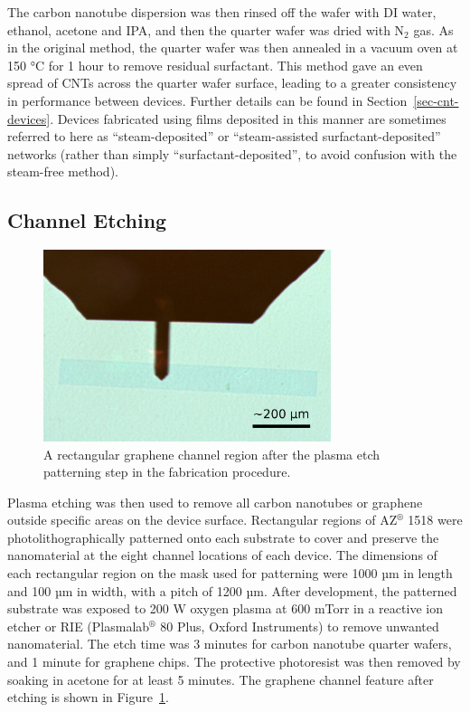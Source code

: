 \documentclass[
  a4paper,
]{scrbook}
\begin{document}
The carbon nanotube dispersion was then rinsed off the wafer with DI
water, ethanol, acetone and IPA, and then the quarter wafer was dried
with N\(_2\) gas. As in the original method, the quarter wafer was then
annealed in a vacuum oven at 150 °C for 1 hour to remove residual
surfactant. This method gave an even spread of CNTs across the quarter
wafer surface, leading to a greater consistency in performance between
devices. Further details can be found in Section~\ref{sec-cnt-devices}.
Devices fabricated using films deposited in this manner are sometimes
referred to here as ``steam-deposited'' or ``steam-assisted
surfactant-deposited'' networks (rather than simply
``surfactant-deposited'', to avoid confusion with the steam-free
method).

\hypertarget{channel-etching}{%
\subsection{Channel Etching}\label{channel-etching}}

\begin{figure}

{\centering \includegraphics[width=0.75\textwidth,height=\textheight]{figures/ch4/modified_channel-area.png}

}

\caption[A rectangular graphene channel region after the plasma etch
patterning step in the fabrication
procedure.]{\label{fig-microscope-graphene-channel}A rectangular
graphene channel region after the plasma etch patterning step in the
fabrication procedure.}

\end{figure}

Plasma etching was then used to remove all carbon nanotubes or graphene
outside specific areas on the device surface. Rectangular regions of
AZ\(^\circledR\) 1518 were photolithographically patterned onto each
substrate to cover and preserve the nanomaterial at the eight channel
locations of each device. The dimensions of each rectangular region on
the mask used for patterning were 1000 µm in length and 100 µm in width,
with a pitch of 1200 µm. After development, the patterned substrate was
exposed to 200 W oxygen plasma at 600 mTorr in a reactive ion etcher or
RIE (Plasmalab\(^\circledR\) 80 Plus, Oxford Instruments) to remove
unwanted nanomaterial. The etch time was 3 minutes for carbon nanotube
quarter wafers, and 1 minute for graphene chips. The protective
photoresist was then removed by soaking in acetone for at least 5
minutes. The graphene channel feature after etching is shown in
Figure~\ref{fig-microscope-graphene-channel}.
\end{document}
